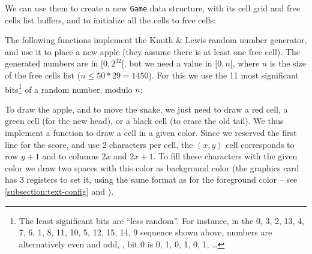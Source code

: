 We can use them to create a new {\tt Game} data structure, with its cell grid
and free cells list buffers, and to initialize all the cells to free cells:


The following functions implement the Knuth \& Lewis random number generator,
and use it to place a new apple (they assume there is at least one free cell).
The generated numbers are in $[0, 2^{32}[$, but we need a value in $[0, n[$,
where $n$ is the size of the free cells list ($n \le 50*29 = 1450$). For this
we use the 11 most significant bits\footnote{The least significant bits are
``less random''. For instance, in the 0, 3, 2, 13, 4, 7, 6, 1, 8, 11, 10, 5,
12, 15, 14, 9 sequence shown above, numbers are alternatively even and odd,
\ie, bit 0 is 0, 1, 0, 1, 0, 1, \ldots} of a random number, modulo $n$:


To draw the apple, and to move the snake, we just need to draw a red cell, a
green cell (for the new head), or a black cell (to erase the old tail). We thus
implement a function to draw a cell in a given color. Since we
reserved the first line for the score, and use 2 characters per cell, the
$(x,y)$ cell corresponds to row $y+1$ and to columns $2x$ and $2x+1$. To fill
these characters with the given color we draw two spaces with this color as
background color (the graphics card has 3 registers to set it, using the same
format as for the foreground color -- see \cref{subsection:text-config} and
\cite{RA8875}).

